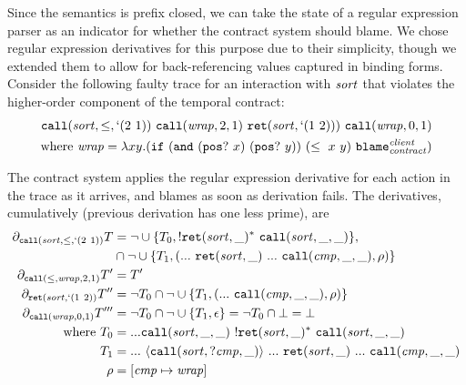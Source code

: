 Since the semantics is prefix closed, we can take the state of a regular expression parser as an indicator for whether the contract system should blame.
%
We chose regular expression derivatives for this purpose due to their simplicity, though we extended them to allow for back-referencing values captured in binding forms.
%
Consider the following faulty trace for an interaction with $\mathit{sort}$ that violates the higher-order component of the temporal contract:
\newcommand*{\wrapv}{\mathit{wrap}}
\begin{align*}
  {\tt call}(\sortid, \le, {\tt `}(2\ 1))~{\tt call}(\wrapv, 2, 1) ~{\tt ret}(\sortid, {\tt `}(1\ 2))) ~{\tt call}(\wrapv, 0, 1) \\
  \text{where } \wrapv  = \lambda x y. ({\tt if}\ ({\tt and}\ ({\tt pos?}\ x)\ ({\tt pos?}\ y))\ (\le\ x\ y)\ \sblame{\mathit{client}}{\mathit{contract}})
\end{align*}

The contract system applies the regular expression derivative for each action in the trace as it arrives, and blames as soon as derivation fails.
%
The derivatives, cumulatively (previous derivation has one less prime), are
\begin{align*}
  \derive{{\tt call}(\sortid, \le, {\tt `}(2\ 1))}{\mtcon} &= \stnot{\stOr{\setof{\mtcon_0, \stmany{\snonevent{{\tt ret}(\sortid, \_)}} ~{\tt call}(\sortid, \_, \_)}}},
    \\ &\cap \stnot{\stOr{\setof{\mtcon_1, ({\sddd~ {\tt ret}(\sortid, \_)~ \sddd~ {\tt call}(\mathit{cmp}, \_, \_)}, \menv)}}} \\
%
  \derive{{\tt call}(\le, \wrapv, 2, 1)}{\mtcon'} &= \mtcon' \\
%
  \derive{{\tt ret}(\sortid, {\tt `}(1\ 2))}{\mtcon''} &= \stnot{\mtcon_0} \cap \stnot{\stOr{\setof{\mtcon_1, (\sddd~ {\tt call}(\mathit{cmp}, \_, \_), \menv)}}} \\
%
  \derive{{\tt call}(\wrapv, 0, 1)}{\mtcon'''} &= \stnot{\mtcon_0} \cap \stnot{\stOr{\setof{\mtcon_1, \epsilon}}} = \stnot{\mtcon_0}\cap \bot = \bot \\
%
  \text{where } \mtcon_0 & = \sddd {\tt call}(\sortid, \_,\_)~ \stmany{\snonevent{{\tt ret}(\sortid, \_)}}~ {\tt call}(\sortid,\_,\_) \\
  \mtcon_1 &= \sddd~ \stbind{{\tt call}(\sortid, ?\mathit{cmp}, \_)}{\sddd~ {\tt ret}(\sortid, \_)~ \sddd~ {\tt call}(\mathit{cmp}, \_, \_)} \\
  \menv &= [\mathit{cmp} \mapsto \wrapv]
\end{align*}

